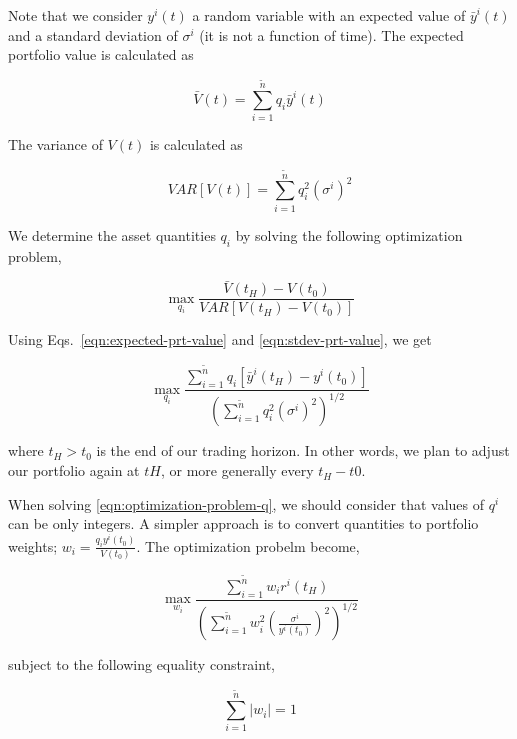 \documentclass{article}
\begin{document}
Note that we consider $y^{i}(t)$ a random variable with an expected
value of $\bar{y}^{i}(t)$ and a standard deviation of $\sigma^{i}$ (it
is not a function of time). The expected portfolio value is calculated
as

\begin{equation}\label{eqn:expected-prt-value}
\bar{V}(t) = \sum_{i=1}^{\tilde{n}} q_{i} \bar{y}^{i}(t)
\end{equation}

The variance of $V(t)$ is calculated as

\begin{equation}\label{eqn:stdev-prt-value}
VAR[V(t)] = \sum_{i=1}^{\tilde{n}} q_{i}^{2} (\sigma^{i})^{2}
\end{equation}

We determine the asset quantities $q_{i}$ by solving the following
optimization problem,

\begin{equation}\label{eqn:optimization-problem-V}
\max_{q_{i}} \frac{\bar{V}(t_{H})-V(t_{0})}{VAR[V(t_{H})-V(t_{0})]}
\end{equation}

Using Eqs.~\ref{eqn:expected-prt-value} and \ref{eqn:stdev-prt-value},
we get

\begin{equation}\label{eqn:optimization-problem-q}
\max_{q_{i}} \frac{\sum_{i=1}^{\tilde{n}}
  q_{i} [\bar{y}^{i}(t_{H})-y^{i}(t_{0})]}{(\sum_{i=1}^{\tilde{n}}
    q_{i}^{2} (\sigma^{i})^{2})^{1/2}}
\end{equation}

where $t_{H} > t_{0}$ is the end of our trading horizon. In other
words, we plan to adjust our portfolio again at $t{H}$, or more
generally every $t_{H}-t{0}$.

When solving \ref{eqn:optimization-problem-q}, we should consider that
values of $q^{i}$ can be only integers. A simpler approach is to
convert quantities to portfolio weights; $w_{i} = \frac{q_{i}
  y^{i}(t_{0})}{V(t_{0})}$. The optimization probelm become,

\begin{equation}\label{eqn:optimization-problem-w}
\max_{w_{i}} \frac{\sum_{i=1}^{\tilde{n}}
  w_{i} r^{i}(t_{H})}{(\sum_{i=1}^{\tilde{n}}
  w_{i}^{2} (\frac{\sigma^{i}}{y^{i}(t_{0})})^{2})^{1/2}}
\end{equation}

subject to the following equality constraint,

\begin{equation}\label{eqn:sum-constraint}
\sum_{i=1}^{\tilde{n}} |w_{i}| = 1
\end{equation}
\end{document}
